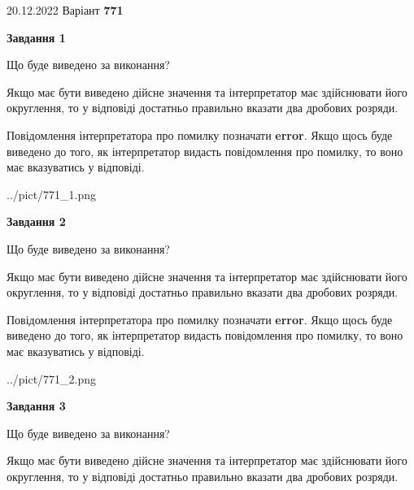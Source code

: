 \documentclass[12pt, ukrainian]{article}
\begin{document}
{20.12.2022 Варіант \No \textbf { 771 }\par}
{
\begin {Large}

{\begin {center}\textbf{Завдання 1}\end {center}}\par
Що буде виведено за виконання? \par

Якщо має бути виведено дійсне значення та інтерпретатор має здійснювати його округлення, 
то у відповіді достатньо правильно вказати два дробових розряди.

Повідомлення інтерпретатора про помилку позначати \textbf{error}.
Якщо щось буде виведено до того, як інтерпретатор видасть повідомлення про помилку, 
то воно має вказуватись у відповіді. \par

\begin{center}
	{../pict/771_1.png}
\end{center}
\newpage

{\begin {center}\textbf{Завдання 2}\end {center}}\par
Що буде виведено за виконання? \par

Якщо має бути виведено дійсне значення та інтерпретатор має здійснювати його округлення, 
то у відповіді достатньо правильно вказати два дробових розряди.

Повідомлення інтерпретатора про помилку позначати \textbf{error}.
Якщо щось буде виведено до того, як інтерпретатор видасть повідомлення про помилку, 
то воно має вказуватись у відповіді. \par

\begin{center}
	{../pict/771_2.png}
\end{center}
\newpage

{\begin {center}\textbf{Завдання 3}\end {center}}\par
Що буде виведено за виконання? \par

Якщо має бути виведено дійсне значення та інтерпретатор має здійснювати його округлення, 
то у відповіді достатньо правильно вказати два дробових розряди.


\end{Large}}
\end{document}
